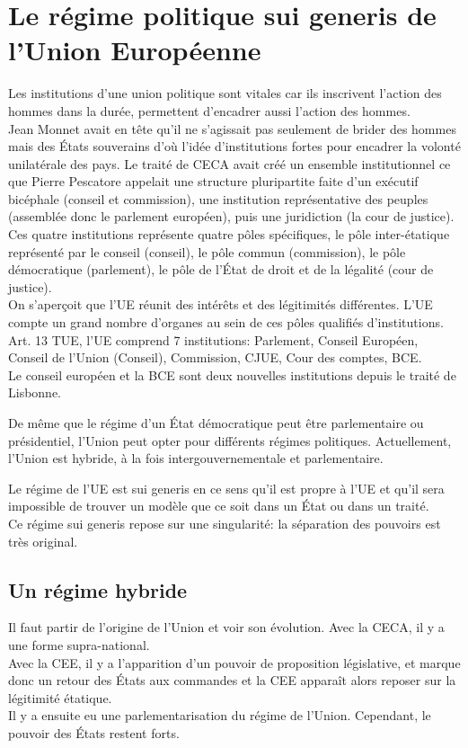 \documentclass[12pt, a4paper, openany]{book}
\begin{document}
\chapter{Le régime politique sui generis de l'Union Européenne}

Les institutions d'une union politique sont vitales car ils inscrivent l'action des hommes dans la durée, permettent d'encadrer aussi l'action des hommes. \\
Jean Monnet avait en tête qu'il ne s'agissait pas seulement de brider des hommes mais des États souverains d'où l'idée d'institutions fortes pour encadrer la volonté unilatérale des pays. Le traité de CECA avait créé un ensemble institutionnel ce que Pierre Pescatore appelait une structure pluripartite faite d'un exécutif bicéphale (conseil et commission), une institution représentative des peuples (assemblée donc le parlement européen), puis une juridiction (la cour de justice). Ces quatre institutions représente quatre pôles spécifiques, le pôle inter-étatique représenté par le conseil (conseil), le pôle commun (commission), le pôle démocratique (parlement), le pôle de l'État de droit et de la légalité (cour de justice). \\
On s'aperçoit que l'UE réunit des intérêts et des légitimités différentes. L'UE compte un grand nombre d'organes au sein de ces pôles qualifiés d'institutions. Art. 13 TUE, l'UE comprend 7 institutions: Parlement, Conseil Européen, Conseil de l'Union (Conseil), Commission, CJUE, Cour des comptes, BCE. \\
Le conseil européen et la BCE sont deux nouvelles institutions depuis le traité de Lisbonne. 


De même que le régime d'un État démocratique peut être parlementaire ou présidentiel, l'Union peut opter pour différents régimes politiques. Actuellement, l'Union est hybride, à la fois intergouvernementale et parlementaire. 


Le régime de l'UE est sui generis en ce sens qu'il est propre à l'UE et qu'il sera impossible de trouver un modèle que ce soit dans un État ou dans un traité. \\
Ce régime sui generis repose sur une singularité: la séparation des pouvoirs est très original.

\section{Un régime hybride}

Il faut partir de l'origine de l'Union et voir son évolution. Avec la CECA, il y a une forme supra-national. \\
Avec la CEE, il y a l'apparition d'un pouvoir de proposition législative, et marque donc un retour des États aux commandes et la CEE apparaît alors reposer sur la légitimité étatique. \\
Il y a ensuite eu une parlementarisation du régime de l'Union. Cependant, le pouvoir des États restent forts.
\end{document}

